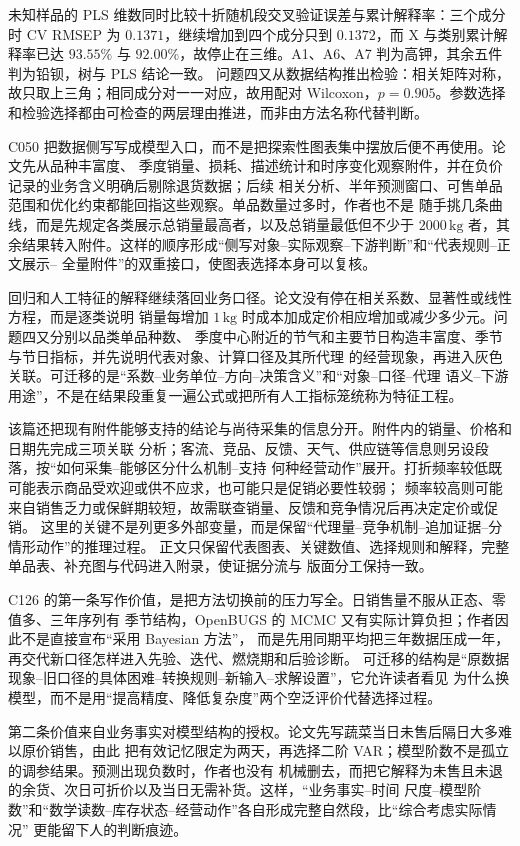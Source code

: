 未知样品的 PLS 维数同时比较十折随机段交叉验证误差与累计解释率：三个成分时 CV RMSEP 为
$0.1371$，继续增加到四个成分只到 $0.1372$，而 X 与类别累计解释率已达 $93.55\%$ 与
$92.00\%$，故停止在三维。A1、A6、A7 判为高钾，其余五件判为铅钡，树与 PLS 结论一致。
问题四又从数据结构推出检验：相关矩阵对称，故只取上三角；相同成分对一一对应，故用配对
Wilcoxon，$p=0.905$。参数选择和检验选择都由可检查的两层理由推进，而非由方法名称代替判断。

C050 把数据侧写写成模型入口，而不是把探索性图表集中摆放后便不再使用。论文先从品种丰富度、
季度销量、损耗、描述统计和时序变化观察附件，并在负价记录的业务含义明确后剔除退货数据；后续
相关分析、半年预测窗口、可售单品范围和优化约束都能回指这些观察。单品数量过多时，作者也不是
随手挑几条曲线，而是先规定各类展示总销量最高者，以及总销量最低但不少于 $2000\,\mathrm{kg}$
者，其余结果转入附件。这样的顺序形成“侧写对象--实际观察--下游判断”和“代表规则--正文展示--
全量附件”的双重接口，使图表选择本身可以复核。

回归和人工特征的解释继续落回业务口径。论文没有停在相关系数、显著性或线性方程，而是逐类说明
销量每增加 $1\,\mathrm{kg}$ 时成本加成定价相应增加或减少多少元。问题四又分别以品类单品种数、
季度中心附近的节气和主要节日构造丰富度、季节与节日指标，并先说明代表对象、计算口径及其所代理
的经营现象，再进入灰色关联。可迁移的是“系数--业务单位--方向--决策含义”和“对象--口径--代理
语义--下游用途”，不是在结果段重复一遍公式或把所有人工指标笼统称为特征工程。

该篇还把现有附件能够支持的结论与尚待采集的信息分开。附件内的销量、价格和日期先完成三项关联
分析；客流、竞品、反馈、天气、供应链等信息则另设段落，按“如何采集--能够区分什么机制--支持
何种经营动作”展开。打折频率较低既可能表示商品受欢迎或供不应求，也可能只是促销必要性较弱；
频率较高则可能来自销售乏力或保鲜期较短，故需联查销量、反馈和竞争情况后再决定定价或促销。
这里的关键不是列更多外部变量，而是保留“代理量--竞争机制--追加证据--分情形动作”的推理过程。
正文只保留代表图表、关键数值、选择规则和解释，完整单品表、补充图与代码进入附录，使证据分流与
版面分工保持一致。

C126 的第一条写作价值，是把方法切换前的压力写全。日销售量不服从正态、零值多、三年序列有
季节结构，OpenBUGS 的 MCMC 又有实际计算负担；作者因此不是直接宣布“采用 Bayesian 方法”，
而是先用同期平均把三年数据压成一年，再交代新口径怎样进入先验、迭代、燃烧期和后验诊断。
可迁移的结构是“原数据现象--旧口径的具体困难--转换规则--新输入--求解设置”，它允许读者看见
为什么换模型，而不是用“提高精度、降低复杂度”两个空泛评价代替选择过程。

第二条价值来自业务事实对模型结构的授权。论文先写蔬菜当日未售后隔日大多难以原价销售，由此
把有效记忆限定为两天，再选择二阶 VAR；模型阶数不是孤立的调参结果。预测出现负数时，作者也没有
机械删去，而把它解释为未售且未退的余货、次日可折价以及当日无需补货。这样，“业务事实--时间
尺度--模型阶数”和“数学读数--库存状态--经营动作”各自形成完整自然段，比“综合考虑实际情况”
更能留下人的判断痕迹。

